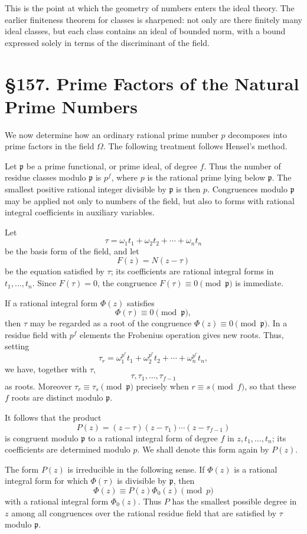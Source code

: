 \documentclass[11pt,a4paper]{book}
\newcommand{\webersection}[2]{\clearpage\section*{\S #1. #2}}
\newcommand{\p}{\mathfrak p}
\begin{document}
This is the point at which the geometry of numbers enters the ideal theory.  The earlier finiteness theorem for classes is sharpened: not only are there finitely many ideal classes, but each class contains an ideal of bounded norm, with a bound expressed solely in terms of the discriminant of the field.

\webersection{157}{Prime Factors of the Natural Prime Numbers}

We now determine how an ordinary rational prime number \(p\) decomposes into prime factors in the field \(\Omega\).  The following treatment follows Hensel's method.

Let \(\p\) be a prime functional, or prime ideal, of degree \(f\).  Thus the number of residue classes modulo \(\p\) is \(p^f\), where \(p\) is the rational prime lying below \(\p\).  The smallest positive rational integer divisible by \(\p\) is then \(p\).  Congruences modulo \(\p\) may be applied not only to numbers of the field, but also to forms with rational integral coefficients in auxiliary variables.

Let
\[
  \tau=\omega_1t_1+\omega_2t_2+\cdots+\omega_n t_n
\]
be the basis form of the field, and let
\[
  F(z)=N(z-\tau)
\]
be the equation satisfied by \(\tau\); its coefficients are rational integral forms in \(t_1,\ldots,t_n\).  Since \(F(\tau)=0\), the congruence \(F(\tau)\equiv0\pmod{\p}\) is immediate.

If a rational integral form \(\Phi(z)\) satisfies
\[
  \Phi(\tau)\equiv0\pmod{\p},
\tag{1}
\]
then \(\tau\) may be regarded as a root of the congruence \(\Phi(z)\equiv0\pmod{\p}\).  In a residue field with \(p^f\) elements the Frobenius operation gives new roots.  Thus, setting
\[
  \tau_r=\omega_1^{p^r}t_1+\omega_2^{p^r}t_2+\cdots+\omega_n^{p^r}t_n,
\]
we have, together with \(\tau\),
\[
  \tau,\tau_1,\ldots,\tau_{f-1}
\]
as roots.  Moreover \(\tau_r\equiv\tau_s\pmod{\p}\) precisely when \(r\equiv s\pmod f\), so that these \(f\) roots are distinct modulo \(\p\).

It follows that the product
\[
  P(z)=(z-\tau)(z-\tau_1)\cdots(z-\tau_{f-1})
\tag{2}
\]
is congruent modulo \(\p\) to a rational integral form of degree \(f\) in \(z,t_1,\ldots,t_n\); its coefficients are determined modulo \(p\).  We shall denote this form again by \(P(z)\).

The form \(P(z)\) is irreducible in the following sense.  If \(\Phi(z)\) is a rational integral form for which \(\Phi(\tau)\) is divisible by \(\p\), then
\[
  \Phi(z)\equiv P(z)\Phi_0(z)\pmod p
\tag{3}
\]
with a rational integral form \(\Phi_0(z)\).  Thus \(P\) has the smallest possible degree in \(z\) among all congruences over the rational residue field that are satisfied by \(\tau\) modulo \(\p\).
\end{document}
